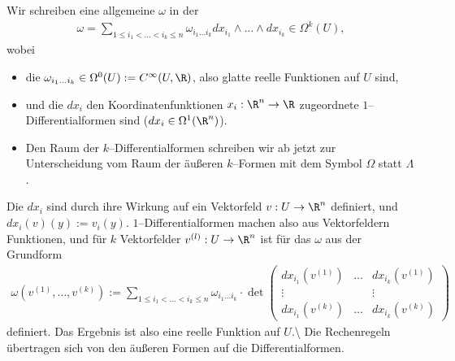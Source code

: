 \documentclass[letterpaper,10pt,english]{jupyterBook}
\begin{document}
\sphinxAtStartPar
Wir schreiben eine allgemeine  \(\omega\) in der 
\begin{equation*}
\begin{split}\omega = \sum_{1\leq i_1<\ldots<i_k\leq n}\omega_{i_1\ldots i_k}
dx_{i_1}\wedge\ldots\wedge dx_{i_k}\in\Omega^k(U),\end{split}
\end{equation*}
\sphinxAtStartPar
wobei
\begin{itemize}
\item {} 
\sphinxAtStartPar
die \(\omega_{i_1\ldots i_k}\in \Omega^0(U):=C^\infty(U,\R)\), also glatte reelle Funktionen auf \(U\) sind,

\item {} 
\sphinxAtStartPar
und die \(dx_i\) den Koordinatenfunktionen \(x_i:\R^n\to\R\) zugeordnete \(1\)–Differentialformen sind (\(dx_i\in\Omega^1(\R^n)\)).

\item {} 
\sphinxAtStartPar
Den Raum der \(k\)–Differentialformen schreiben wir ab jetzt zur Unterscheidung vom Raum der äußeren \(k\)–Formen mit dem Symbol \(\Omega\) statt \(\Lambda\).

\end{itemize}

\sphinxAtStartPar
Die \(dx_i\) sind durch ihre Wirkung auf ein Vektorfeld \(v:U\to
\R^n\) definiert, und \(dx_i(v)( y) := v_i( y)\).
\(1\)–Differentialformen machen also aus Vektorfeldern Funktionen, und für \(k\) Vektorfelder \(v^{(l)}:U\to\R^n\) ist für das \(\omega\) aus der Grundform
\begin{equation*}
\begin{split}\omega\left(v^{(1)},\ldots,v^{(k)}\right) := \sum_{1\leq i_1<\ldots<i_k\leq n}
\omega_{i_1\ldots i_k}\cdot\det\begin{pmatrix} dx_{i_1}(v^{(1)})&\ldots& dx_{i_k}(v^{(1)})\\
\vdots&&\vdots\\
dx_{i_1}(v^{(k)})&\ldots& dx_{i_k}(v^{(k)}) \end{pmatrix}\end{split}
\end{equation*}
\sphinxAtStartPar
definiert. Das Ergebnis ist also eine reelle Funktion auf \(U\).\textbackslash{}
Die Rechenregeln übertragen sich von den äußeren Formen auf die Differentialformen.
\end{document}
